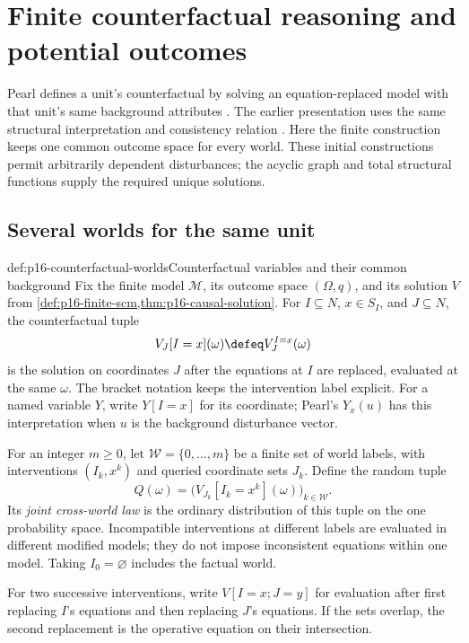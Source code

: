 \section{Finite counterfactual reasoning and potential outcomes}
\label{sec:p16-finite-counterfactuals}

Pearl defines a unit's counterfactual by solving an equation-replaced
model with that unit's same background attributes
\cite[Definition~4 and Eq.~(27), pp.~120--121]{Pearl2009CausalOverview}.
The earlier presentation uses the same structural interpretation and
consistency relation \cite[author's rejoinder, p.~703]{Pearl1995CausalDiagrams}.
Here the finite construction keeps one common outcome space for every
world. These initial constructions permit arbitrarily dependent
disturbances; the acyclic graph and total structural functions supply
the required unique solutions.

\subsection{Several worlds for the same unit}

\begin{hbdefinition}{def:p16-counterfactual-worlds}{Counterfactual variables and their common background}
Fix the finite model \(\mathcal M\), its outcome space
\((\Omega,q)\), and its solution \(V\) from
\cref{def:p16-finite-scm,thm:p16-causal-solution}.
For \(I\subseteq N\), \(x\in S_I\), and \(J\subseteq N\),
the counterfactual tuple
\[
 V_J[I=x](\omega)\defeq V_J^{I=x}(\omega)
\]
is the solution on coordinates \(J\) after the equations at \(I\)
are replaced, evaluated at the same \(\omega\). The bracket notation
keeps the intervention label explicit. For a named variable \(Y\),
write \(Y[I=x]\) for its coordinate; Pearl's \(Y_x(u)\) has
this interpretation when \(u\) is the background disturbance vector.

For an integer \(m\geq0\), let \(\mathcal W=\{0,\ldots,m\}\) be a finite set of world
labels, with interventions \((I_k,x^k)\) and queried coordinate
sets \(J_k\). Define the random tuple
\[
 Q(\omega)=\bigl(V_{J_k}[I_k=x^k](\omega)\bigr)_{k\in\mathcal W}.
\]
Its \emph{joint cross-world law} is the ordinary distribution of
this tuple on the one probability space. Incompatible interventions
at different labels are evaluated in different modified models;
they do not impose inconsistent equations within one model.
Taking \(I_0=\varnothing\) includes the factual world.

For two successive interventions, write
\(V[I=x;J=y]\) for evaluation after first replacing \(I\)'s
equations and then replacing \(J\)'s equations. If the sets overlap,
the second replacement is the operative equation on their intersection.
\end{hbdefinition}

